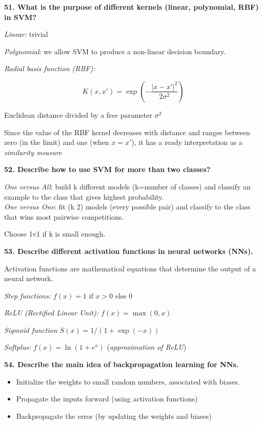 \textbf{51. What is the purpose of different kernels (linear,
polynomial, RBF) in SVM?}

\textit{Linear:} trivial

\textit{Polynomial}: we allow SVM to produce a non-linear decision
boundary.

\textit{Radial basis function (RBF):}

\[ K(x, x') = \exp \left( - \frac{ | x - x' | ^2 }{ 2\sigma^2} \right) \]

Euclidean distance divided by a free parameter $\sigma^2$

Since the value of the RBF kernel decreases with distance and ranges
between zero (in the limit) and one (when $x = x'$), it has a ready
interpretation as a \emph{similarity measure}

\textbf{52. Describe how to use SVM for more than two classes?}

\textit{One versus All}: build k different models (k=number of
classes) and classify an example to the class that gives highest
probability.\\
\textit{One versus One}: fit (k 2) models (every possible pair) and
classify to the class that wins most pairwise competitions.

Choose 1v1 if k is small enough.

\textbf{53. Describe different activation functions in neural networks
(NNs).}

Activation functions are mathematical equations that determine the
output of a neural network.

\textit{Step functions:} $f(x) = {1 \text{ if } x > 0 \text{ else } 0}$

\textit{ReLU (Rectified Linear Unit):} $f(x) = \max(0, x)$

\textit{Sigmoid function} $ S(x) = 1/(1+\exp(-x)) $

\textit{Softplus:} $f(x) = \ln(1+e^x)$ (\textit{approximation of ReLU})

\textbf{54. Describe the main idea of backpropagation learning for NNs.}

\begin{itemize}
\item Initialize the weights to small random numbers, associated with biases.
\item Propagate the inputs forward (using activation functions)
\item Backpropagate the error (by updating the weights and biases)
\end{itemize}

